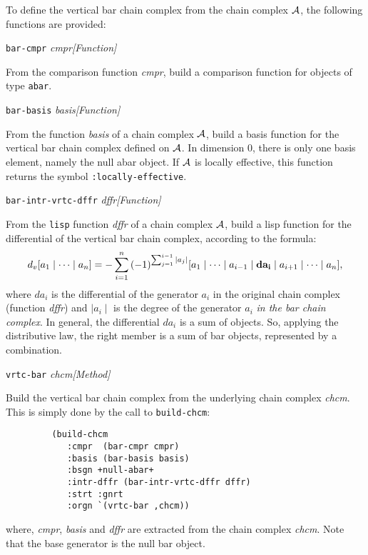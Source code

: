 To define the vertical bar chain complex from the chain complex ${\cal A}$, the
following functions are provided:
\vskip 0.45cm
{\parindent=0mm
{\leftskip=5mm
{\tt bar-cmpr} {\em cmpr}\hfill {\em [Function]} \par}
{\leftskip=15mm
From the comparison function {\em cmpr}, build a comparison function for objects
of  type {\tt abar}. \par}
{\leftskip=5mm
{\tt bar-basis} {\em basis}\hfill {\em [Function]} \par}
{\leftskip=15mm
From the function {\em basis} of a  chain complex ${\cal A}$, build a basis
function for the vertical bar chain complex defined on ${\cal A}$. In dimension $0$, there
is only one basis element, namely the null abar object. If ${\cal A}$ is locally effective,
this function returns the symbol {\tt :locally-effective}. \par}
{\leftskip=5mm
{\tt bar-intr-vrtc-dffr} {\em dffr}\hfill {\em [Function]} \par}
{\leftskip=15mm
From the {\tt lisp} function {\em dffr} of a chain complex  ${\cal A}$, build a
lisp function for the differential of the vertical bar chain complex, according to the formula:
$$d_v [a_1 \mid \cdots \mid a_n]=
-\sum_{i=1}^n{(-1)^{\sum_{j=1}^{i-1}{\mid a_j \mid}}}
 {[a_1 \mid \cdots \mid a_{i-1} \mid {\bf da_i} \mid a_{i+1} \mid \cdots \mid a_n]},$$
where $da_i$ is the differential of the generator $a_i$ in the original chain complex (function {\em dffr})
and $\mid a_i \mid$ is the degree of the generator $a_i$ {\em in the bar chain complex}.
In general, the differential $da_i$ is a sum of  objects.
So, applying the distributive law, the right member is a sum of bar objects, represented by a combination. \par}
{\leftskip=5mm
{\tt vrtc-bar} {\em chcm}\hfill {\em [Method]} \par}
{\leftskip=15mm
Build the vertical bar chain complex from the underlying chain complex {\em chcm}. This is simply done by the
call to {\tt build-chcm}:
{\footnotesize\begin{verbatim}
         (build-chcm
            :cmpr  (bar-cmpr cmpr)
            :basis (bar-basis basis)
            :bsgn +null-abar+
            :intr-dffr (bar-intr-vrtc-dffr dffr)
            :strt :gnrt
            :orgn `(vrtc-bar ,chcm))
\end{verbatim}}
where, {\em cmpr}, {\em basis} and {\em dffr} are extracted from the chain complex {\em chcm}. Note that
the base generator is the null bar object. \par}
}

